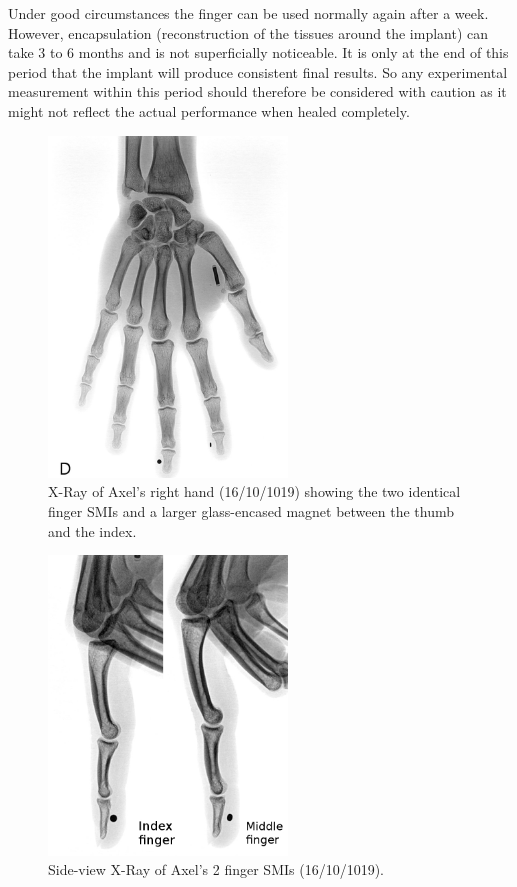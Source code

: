 \documentclass[10pt,journal,compsoc]{IEEEtran}
\begin{document}
			Under good circumstances the finger can be used normally again after a week. However, encapsulation (reconstruction of the tissues around the implant) can take 3 to 6 months and is not superficially noticeable. It is only at the end of this period that the implant will produce consistent final results. So any experimental measurement within this period should therefore be considered with caution as it might not reflect the actual performance when healed completely.
			
			\begin{figure}[!t]
				\centering
				\includegraphics[width=2.5in]{FullHandXrayNeg}
				\caption{X-Ray of Axel's right hand (16/10/1019) showing the two identical finger SMIs and a larger glass-encased magnet between the thumb and the index.}
				\label{FullHandXray}
			\end{figure}
			
			\begin{figure}[!t]
				\centering
				\includegraphics[width=2.5in]{FingersXrayNeg}
				\caption{Side-view X-Ray of Axel's 2 finger SMIs (16/10/1019).}
				\label{FingersXray}
			\end{figure}
			
\end{document}
